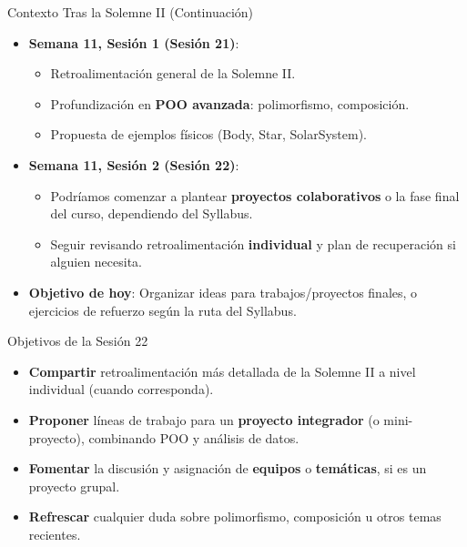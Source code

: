 \documentclass[10pt]{beamer}
\begin{document}
\begin{frame}{Contexto Tras la Solemne II (Continuación)}
  \begin{itemize}
    \item \textbf{Semana 11, Sesión 1 (Sesión 21)}:
      \begin{itemize}
        \item Retroalimentación general de la Solemne II.
        \item Profundización en \textbf{POO avanzada}: polimorfismo, composición.
        \item Propuesta de ejemplos físicos (Body, Star, SolarSystem).
      \end{itemize}
    \item \textbf{Semana 11, Sesión 2 (Sesión 22)}:
      \begin{itemize}
        \item Podríamos comenzar a plantear \textbf{proyectos colaborativos} o la fase final del curso, dependiendo del Syllabus.
        \item Seguir revisando retroalimentación \textbf{individual} y plan de recuperación si alguien necesita.
      \end{itemize}
    \item \textbf{Objetivo de hoy}: Organizar ideas para trabajos/proyectos finales, o ejercicios de refuerzo según la ruta del Syllabus.
  \end{itemize}
\end{frame}

\begin{frame}{Objetivos de la Sesión 22}
  \begin{itemize}
    \item \textbf{Compartir} retroalimentación más detallada de la Solemne II a nivel individual (cuando corresponda).
    \item \textbf{Proponer} líneas de trabajo para un \textbf{proyecto integrador} (o mini-proyecto), combinando POO y análisis de datos.
    \item \textbf{Fomentar} la discusión y asignación de \textbf{equipos} o \textbf{temáticas}, si es un proyecto grupal.
    \item \textbf{Refrescar} cualquier duda sobre polimorfismo, composición u otros temas recientes.
  \end{itemize}
\end{frame}
\end{document}
